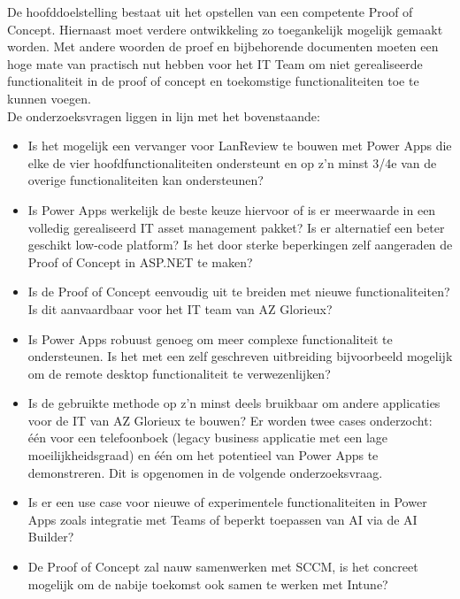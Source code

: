 \vspace{5mm}

De hoofddoelstelling bestaat uit het opstellen van een competente Proof of Concept. Hiernaast moet verdere ontwikkeling zo toegankelijk mogelijk gemaakt worden. Met andere woorden de proef en bijbehorende documenten moeten een hoge mate van practisch nut hebben voor het IT Team om niet gerealiseerde functionaliteit in de proof of concept en toekomstige functionaliteiten toe te kunnen voegen.\\
De onderzoeksvragen liggen in lijn met het bovenstaande:
\begin{itemize}
    \item Is het mogelijk een vervanger voor LanReview te bouwen met Power Apps die elke de vier hoofdfunctionaliteiten ondersteunt en op z'n minst 3/4e van de overige functionaliteiten kan ondersteunen?
    \item Is Power Apps werkelijk de beste keuze hiervoor of is er meerwaarde in een volledig gerealiseerd IT asset management pakket? Is er alternatief een beter geschikt low-code platform? Is het door sterke beperkingen zelf aangeraden de Proof of Concept in ASP.NET te maken?
    \item Is de Proof of Concept eenvoudig uit te breiden met nieuwe functionaliteiten? Is dit aanvaardbaar voor het IT team van AZ Glorieux?
    \item Is Power Apps robuust genoeg om meer complexe functionaliteit te ondersteunen. Is het met een zelf geschreven uitbreiding bijvoorbeeld mogelijk om de remote desktop functionaliteit te verwezenlijken?
    \item Is de gebruikte methode op z'n minst deels bruikbaar om andere applicaties voor de IT van AZ Glorieux te bouwen? Er worden twee cases onderzocht: één voor een telefoonboek (legacy business applicatie met een lage moeilijkheidsgraad) en één om het potentieel van Power Apps te demonstreren. Dit is opgenomen in de volgende onderzoeksvraag.
    \item Is er een use case voor nieuwe of experimentele functionaliteiten in Power Apps zoals integratie met Teams of beperkt toepassen van AI via de AI Builder?
    \item De Proof of Concept zal nauw samenwerken met SCCM, is het concreet mogelijk om de nabije toekomst ook samen te werken met Intune?
\end{itemize}



